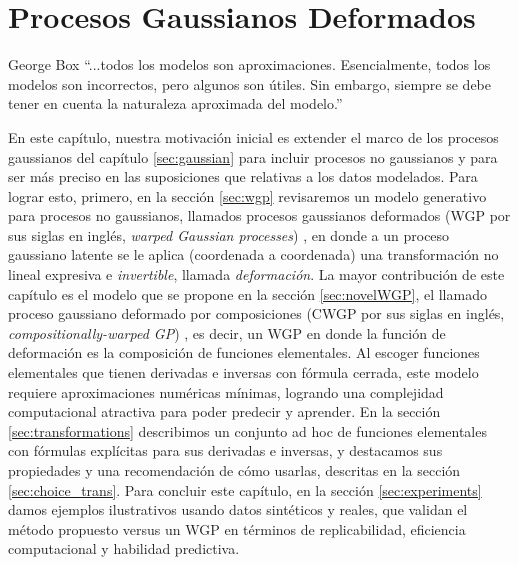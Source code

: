 
\chapter{Procesos Gaussianos Deformados}
\label{sec:cwgp}

\begin{chapquote}{George Box}
	``...todos los modelos son aproximaciones. Esencialmente, todos los modelos son incorrectos, pero algunos son útiles. Sin embargo, siempre se debe tener en cuenta la naturaleza aproximada del modelo.''
\end{chapquote}


En este capítulo, nuestra motivación inicial es extender el marco de los procesos gaussianos \cite{rasmussen06} del capítulo \ref{sec:gaussian} para incluir procesos no gaussianos y para ser más preciso en las suposiciones que relativas a los datos modelados. Para lograr esto, primero, en la sección \ref{sec:wgp} revisaremos un modelo generativo para procesos no gaussianos, llamados procesos gaussianos deformados (WGP por sus siglas en inglés, \emph{warped Gaussian processes}) \cite{snelson2004warped}, en donde a un proceso gaussiano latente se le aplica (coordenada a coordenada) una transformación no lineal expresiva e \emph{invertible}, llamada \emph{deformación}. La mayor contribución de este capítulo es el modelo que se propone en la sección \ref{sec:novelWGP}, el llamado proceso gaussiano deformado por composiciones (CWGP por sus siglas en inglés, \emph{compositionally-warped GP}) \cite{riostobar2019cwgp}, es decir, un WGP en donde la función de deformación es la composición de funciones elementales. Al escoger funciones elementales que tienen derivadas e inversas con fórmula cerrada, este modelo requiere aproximaciones numéricas mínimas, logrando una complejidad computacional atractiva para poder predecir y aprender. En la sección \ref{sec:transformations} describimos un conjunto ad hoc de funciones elementales con fórmulas explícitas para sus derivadas e inversas, y destacamos sus propiedades y una recomendación de cómo usarlas, descritas en la sección \ref{sec:choice_trans}. Para concluir este capítulo, en la sección \ref{sec:experiments} damos ejemplos ilustrativos usando datos sintéticos y reales, que validan el método propuesto versus un WGP en términos de replicabilidad, eficiencia computacional y habilidad predictiva.


